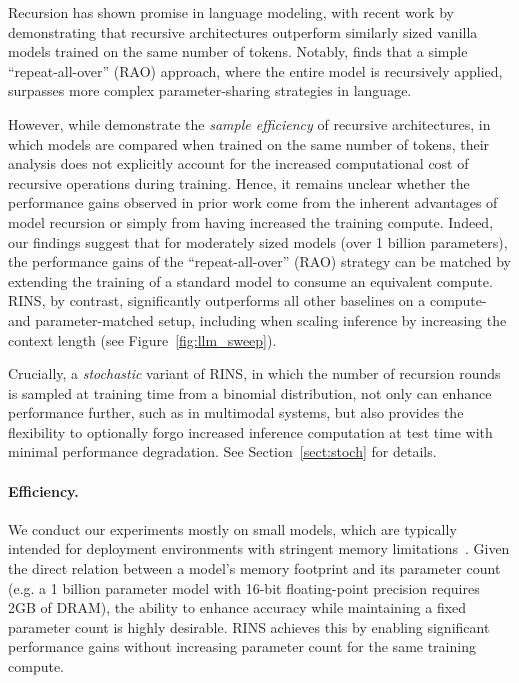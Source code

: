 Recursion has shown promise in language modeling, with recent work by \citet{liu2024mobilellm} demonstrating that recursive architectures outperform similarly sized vanilla models trained on the same number of tokens. Notably, \citet{liu2024mobilellm} finds that a simple ``repeat-all-over'' (RAO) approach, where the entire model is recursively applied, surpasses more complex parameter-sharing strategies in  language. 

However, while \citet{liu2024mobilellm} demonstrate the \emph{sample efficiency} of recursive architectures, in which models are compared when trained on the same number of tokens, their analysis does not explicitly account for the increased computational cost of recursive operations during training.  Hence, it remains unclear whether the performance gains observed in prior work come from the inherent advantages of model recursion or simply from having increased the training compute.  Indeed, our findings suggest that for moderately sized models (over 1 billion parameters), the performance gains of the ``repeat-all-over'' (RAO) strategy can be matched by extending the training of a standard model to consume an equivalent compute. RINS, by contrast, significantly outperforms all other baselines on a compute- and parameter-matched setup, including when scaling inference by increasing the context length (see Figure~\ref{fig:llm_sweep}).

Crucially, a \emph{stochastic} variant of RINS, in which the number of recursion rounds is sampled at training time from a binomial distribution, not only can enhance performance further, such as in multimodal systems, but also provides the flexibility to optionally forgo increased inference computation at test time with minimal performance degradation. See Section~\ref{sect:stoch} for details.


\paragraph{Efficiency.}We conduct our experiments mostly on small models, which are typically intended for deployment environments with stringent memory limitations~\cite{liu2024mobilellm}.  Given the direct relation between a model's memory footprint and its parameter count (e.g. a 1 billion parameter model with 16-bit floating-point precision requires 2GB of DRAM), the ability to enhance accuracy while maintaining a fixed parameter count is highly desirable. RINS achieves this by enabling significant performance gains without increasing parameter count for the same training compute.  

